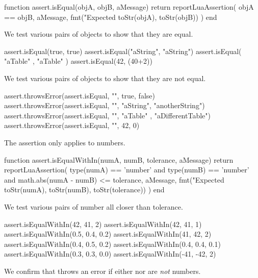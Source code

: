 \startLuaCode
function assert.isEqual(objA, objB, aMessage)
  return reportLuaAssertion(
    objA == objB,
    aMessage,
    fmt("Expected %
      toStr(objA), toStr(objB))
  )
end
\stopLuaCode


We test various pairs of objects to show that they are equal.

\startLuaTest
  assert.isEqual(true, true)
  assert.isEqual("aString", "aString")
  assert.isEqual({ "aTable" }, { "aTable" })
  assert.isEqual(42, (40+2))
\stopLuaTest
\stopTestCase


We test various pairs of objects to show that they are not equal. 

\startLuaTest
  assert.throwsError(assert.isEqual, "", true, false)
  assert.throwsError(assert.isEqual, "",
    "aString", "anotherString")
  assert.throwsError(assert.isEqual, "",
    { "aTable" }, { "aDifferentTable"})
  assert.throwsError(assert.isEqual, "", 42, 0)
\stopLuaTest
\stopTestCase

\stopTestSuite


The  assertion only applies to numbers.

\startLuaCode
function assert.isEqualWithIn(numA, numB,
  tolerance, aMessage)
  return reportLuaAssertion(
    type(numA) == 'number' and type(numB) == 'number'
    and math.abs(numA - numB) <= tolerance,
    aMessage,
    fmt("Expected %
      toStr(numA), toStr(numB), toStr(tolerance))
  )
end
\stopLuaCode


We test various pairs of number all closer than tolerance. 

\startLuaTest
  assert.isEqualWithIn(42, 41, 2)
  assert.isEqualWithIn(42, 41, 1)
  assert.isEqualWithIn(0.5, 0.4, 0.2)
  assert.isEqualWithIn(41, 42, 2)
  assert.isEqualWithIn(0.4, 0.5, 0.2)
  assert.isEqualWithIn(0.4, 0.4, 0.1)
  assert.isEqualWithIn(0.3, 0.3, 0.0)
  assert.isEqualWithIn(-41, -42, 2)
\stopLuaTest
\stopTestCase


We confirm that  throws an error if either 
 nor  are \emph{not} numbers.

